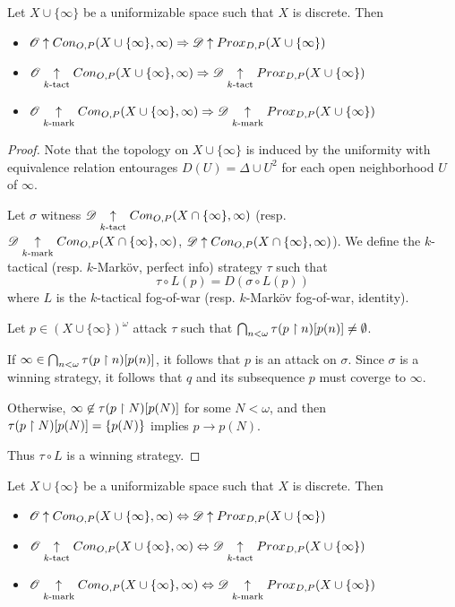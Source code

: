 \begin{theorem}
  Let $X\cup\{\infty\}$ be a uniformizable space such that $X$ is discrete. Then
  \begin{itemize}
    \item
      $\mathscr{O}\uparrow Con_{O,P}(X\cup\{\infty\},\infty) \Rightarrow \mathscr{D} \uparrow Prox_{D,P}(X\cup\{\infty\})$
    \item
      $\mathscr{O}\underset{k\text{-tact}}{\uparrow} Con_{O,P}(X\cup\{\infty\},\infty) \Rightarrow \mathscr{D} \underset{k\text{-tact}}{\uparrow} Prox_{D,P}(X\cup\{\infty\})$
    \item
      $\mathscr{O}\underset{k\text{-mark}}{\uparrow} Con_{O,P}(X\cup\{\infty\},\infty) \Rightarrow \mathscr{D} \underset{k\text{-mark}}{\uparrow} Prox_{D,P}(X\cup\{\infty\})$
  \end{itemize}
\end{theorem}

\begin{proof}
  Note that the topology on $X\cup\{\infty\}$ is induced by the uniformity with equivalence relation entourages $D(U)=\Delta\cup U^2$ for each open neighborhood $U$ of $\infty$.

  Let $\sigma$ witness $\mathscr{D} \underset{k\text{-tact}}{\uparrow}Con_{O,P}(X\cap\{\infty\},\infty)$ (resp. $\mathscr{D} \underset{k\text{-mark}}{\uparrow}Con_{O,P}(X\cap\{\infty\},\infty)$, $\mathscr{D}\uparrow Con_{O,P}(X\cap\{\infty\},\infty)$). We define the $k$-tactical (resp. $k$-Mark\"ov, perfect info) strategy $\tau$ such that
    \[
      \tau\circ L(p)
        =
      D(\sigma\circ L(p))
    \]
  where $L$ is the $k$-tactical fog-of-war (resp. $k$-Mark\"ov fog-of-war, identity).

  Let $p\in (X\cup\{\infty\})^\omega$ attack $\tau$ such that $\bigcap_{n<\omega}\tau(p\restriction n)[p(n)]\not=\emptyset$.

  If $\infty\in\bigcap_{n<\omega}\tau(p\restriction n)[p(n)]$, it follows that $p$ is an attack on $\sigma$. Since $\sigma$ is a winning strategy, it follows that $q$ and its subsequence $p$ must coverge to $\infty$.

  Otherwise, $\infty\not\in\tau(p\restriction N)[p(N)]$ for some $N<\omega$, and then $\tau(p\restriction N)[p(N)]=\{p(N)\}$ implies $p\to p(N)$.

  Thus $\tau\circ L$ is a winning strategy.
\end{proof}

\begin{corollary}
  Let $X\cup\{\infty\}$ be a uniformizable space such that $X$ is discrete. Then
  \begin{itemize}
    \item
      $\mathscr{O}\uparrow Con_{O,P}(X\cup\{\infty\},\infty) \Leftrightarrow \mathscr{D} \uparrow Prox_{D,P}(X\cup\{\infty\})$
    \item
      $\mathscr{O}\underset{k\text{-tact}}{\uparrow} Con_{O,P}(X\cup\{\infty\},\infty) \Leftrightarrow \mathscr{D} \underset{k\text{-tact}}{\uparrow} Prox_{D,P}(X\cup\{\infty\})$
    \item
      $\mathscr{O}\underset{k\text{-mark}}{\uparrow} Con_{O,P}(X\cup\{\infty\},\infty) \Leftrightarrow \mathscr{D} \underset{k\text{-mark}}{\uparrow} Prox_{D,P}(X\cup\{\infty\})$
  \end{itemize}
\end{corollary}

